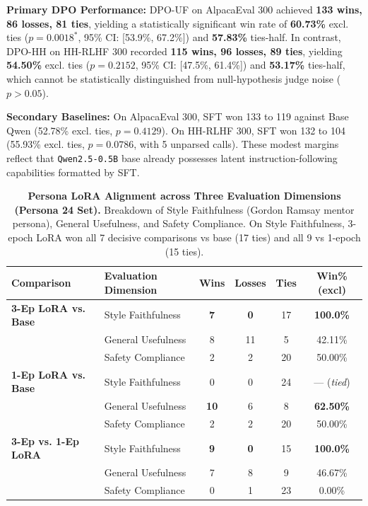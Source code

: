 \documentclass[11pt,a4paper]{article}
\begin{document}
\noindent\textbf{Primary DPO Performance:} DPO-UF on AlpacaEval 300 achieved \textbf{133 wins, 86 losses, 81 ties}, yielding a statistically significant win rate of \textbf{60.73\%} excl. ties ($p = \mathbf{0.0018}^*$, 95\% CI: [53.9\%, 67.2\%]) and \textbf{57.83\%} ties-half. In contrast, DPO-HH on HH-RLHF 300 recorded \textbf{115 wins, 96 losses, 89 ties}, yielding \textbf{54.50\%} excl. ties ($p = 0.2152$, 95\% CI: [47.5\%, 61.4\%]) and \textbf{53.17\%} ties-half, which cannot be statistically distinguished from null-hypothesis judge noise ($p > 0.05$).

\noindent\textbf{Secondary Baselines:} On AlpacaEval 300, SFT won 133 to 119 against Base Qwen (52.78\% excl. ties, $p = 0.4129$). On HH-RLHF 300, SFT won 132 to 104 (55.93\% excl. ties, $p = 0.0786$, with 5 unparsed calls). These modest margins reflect that \texttt{Qwen2.5-0.5B} base already possesses latent instruction-following capabilities formatted by SFT.

\begin{table}[t]
\centering
\scriptsize
\setlength{\tabcolsep}{3pt}
\renewcommand{\arraystretch}{0.88}
\caption{\textbf{Persona LoRA Alignment across Three Evaluation Dimensions (Persona 24 Set).} Breakdown of Style Faithfulness (Gordon Ramsay mentor persona), General Usefulness, and Safety Compliance. On Style Faithfulness, 3-epoch LoRA won all 7 decisive comparisons vs base (17 ties) and all 9 vs 1-epoch (15 ties).}
\label{tab:persona_dimensions}
\begin{tabularx}{\columnwidth}{lXcccc}
\toprule
\textbf{Comparison} & \textbf{Evaluation Dimension} & \textbf{Wins} & \textbf{Losses} & \textbf{Ties} & \textbf{Win\% (excl)} \\
\midrule
\textbf{3-Ep LoRA vs. Base} & Style Faithfulness & \textbf{7} & \textbf{0} & 17 & \textbf{100.0\%} \\
& General Usefulness & 8 & 11 & 5 & 42.11\% \\
& Safety Compliance & 2 & 2 & 20 & 50.00\% \\
\midrule
\textbf{1-Ep LoRA vs. Base} & Style Faithfulness & 0 & 0 & 24 & --- (\textit{tied}) \\
& General Usefulness & \textbf{10} & 6 & 8 & \textbf{62.50\%} \\
& Safety Compliance & 2 & 2 & 20 & 50.00\% \\
\midrule
\textbf{3-Ep vs. 1-Ep LoRA} & Style Faithfulness & \textbf{9} & \textbf{0} & 15 & \textbf{100.0\%} \\
& General Usefulness & 7 & 8 & 9 & 46.67\% \\
& Safety Compliance & 0 & 1 & 23 & 0.00\% \\
\bottomrule
\end{tabularx}
\end{table}
\end{document}
